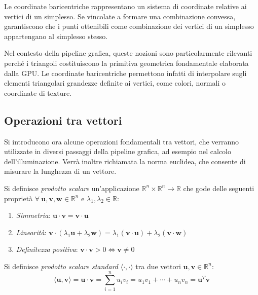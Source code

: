 \begin{osservazione}
    Le coordinate baricentriche rappresentano un sistema di coordinate relative ai vertici di un simplesso.
    Se vincolate a formare una combinazione convessa, garantiscono che i punti ottenibili come combinazione dei vertici di un simplesso appartengano al simplesso stesso.
\end{osservazione}

Nel contesto della pipeline grafica, queste nozioni sono particolarmente rilevanti perché i triangoli costituiscono la primitiva geometrica fondamentale elaborata dalla GPU.
Le coordinate baricentriche permettono infatti di interpolare sugli elementi triangolari grandezze definite ai vertici, come colori, normali o coordinate di texture.

\subsection{Operazioni tra vettori}
Si introducono ora alcune operazioni fondamentali tra vettori, che verranno utilizzate in diversi passaggi della pipeline grafica, ad esempio nel calcolo dell’illuminazione.
Verrà inoltre richiamata la norma euclidea, che consente di misurare la lunghezza di un vettore.

\begin{definizione}
    Si definisce \emph{prodotto scalare} un'applicazione $\mathbb{R}^n \times \mathbb{R}^n \to \mathbb{R}$ che gode delle seguenti proprietà $\forall\ \mathbf{u}, \mathbf{v}, \mathbf{w} \in \mathbb{R}^n$ e $\lambda_1, \lambda_2 \in \mathbb{R}$:
    \begin{enumerate}
        \item \emph{Simmetria}: $ \mathbf{u} \cdot \mathbf{v} = \mathbf{v} \cdot \mathbf{u}$
        \item \emph{Linearità}: $\mathbf{v} \cdot (\lambda_1\mathbf{u} + \lambda_2\mathbf{w}) = \lambda_1(\mathbf{v} \cdot \mathbf{u}) + \lambda_2(\mathbf{v} \cdot \mathbf{w})$
        \item \emph{Definitezza positiva}: $ \mathbf{v} \cdot \mathbf{v} > 0 \iff \mathbf{v} \neq 0 $
    \end{enumerate}
\end{definizione}

\begin{definizione}
    Si definisce \emph{prodotto scalare standard} $\langle \cdot, \cdot \rangle$ tra due vettori $\mathbf{u}, \mathbf{v} \in \mathbb{R}^n$:
    \[
        \langle \mathbf{u}, \mathbf{v} \rangle = \mathbf{u} \cdot \mathbf{v} = \sum_{i=1}^{n} u_i v_i = u_1 v_1 + \cdots + u_n v_n = \mathbf{u}^T \mathbf{v}
    \]
\end{definizione}

